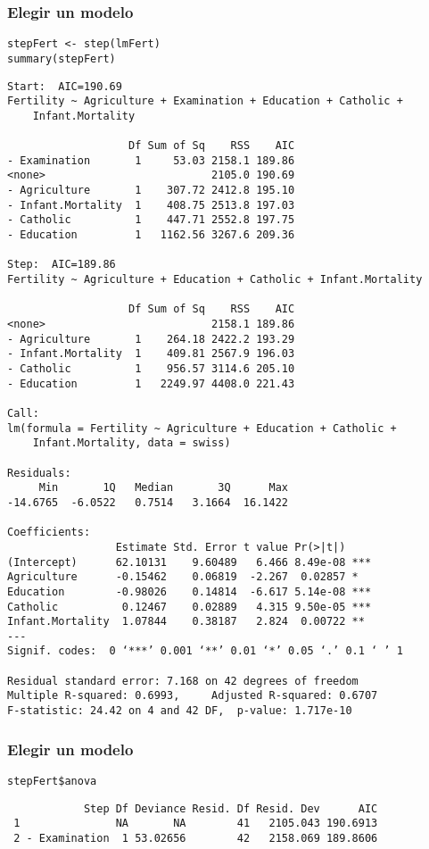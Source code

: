 \documentclass[bigger]{beamer}
\begin{document}
\begin{frame}[fragile]
\frametitle{Elegir un modelo}
\label{sec-3-11}


\lstset{language=R}
\begin{lstlisting}
stepFert <- step(lmFert)
summary(stepFert)
\end{lstlisting}


\begin{verbatim}
Start:  AIC=190.69
Fertility ~ Agriculture + Examination + Education + Catholic + 
    Infant.Mortality

                   Df Sum of Sq    RSS    AIC
- Examination       1     53.03 2158.1 189.86
<none>                          2105.0 190.69
- Agriculture       1    307.72 2412.8 195.10
- Infant.Mortality  1    408.75 2513.8 197.03
- Catholic          1    447.71 2552.8 197.75
- Education         1   1162.56 3267.6 209.36

Step:  AIC=189.86
Fertility ~ Agriculture + Education + Catholic + Infant.Mortality

                   Df Sum of Sq    RSS    AIC
<none>                          2158.1 189.86
- Agriculture       1    264.18 2422.2 193.29
- Infant.Mortality  1    409.81 2567.9 196.03
- Catholic          1    956.57 3114.6 205.10
- Education         1   2249.97 4408.0 221.43

Call:
lm(formula = Fertility ~ Agriculture + Education + Catholic + 
    Infant.Mortality, data = swiss)

Residuals:
     Min       1Q   Median       3Q      Max 
-14.6765  -6.0522   0.7514   3.1664  16.1422 

Coefficients:
                 Estimate Std. Error t value Pr(>|t|)    
(Intercept)      62.10131    9.60489   6.466 8.49e-08 ***
Agriculture      -0.15462    0.06819  -2.267  0.02857 *  
Education        -0.98026    0.14814  -6.617 5.14e-08 ***
Catholic          0.12467    0.02889   4.315 9.50e-05 ***
Infant.Mortality  1.07844    0.38187   2.824  0.00722 ** 
---
Signif. codes:  0 ‘***’ 0.001 ‘**’ 0.01 ‘*’ 0.05 ‘.’ 0.1 ‘ ’ 1 

Residual standard error: 7.168 on 42 degrees of freedom
Multiple R-squared: 0.6993,     Adjusted R-squared: 0.6707 
F-statistic: 24.42 on 4 and 42 DF,  p-value: 1.717e-10
\end{verbatim}
\end{frame}
\begin{frame}[fragile]
\frametitle{Elegir un modelo}
\label{sec-3-12}


\lstset{language=R}
\begin{lstlisting}
stepFert$anova
\end{lstlisting}

\begin{verbatim}
            Step Df Deviance Resid. Df Resid. Dev      AIC
 1               NA       NA        41   2105.043 190.6913
 2 - Examination  1 53.02656        42   2158.069 189.8606
\end{verbatim}
\end{frame}
\end{document}
